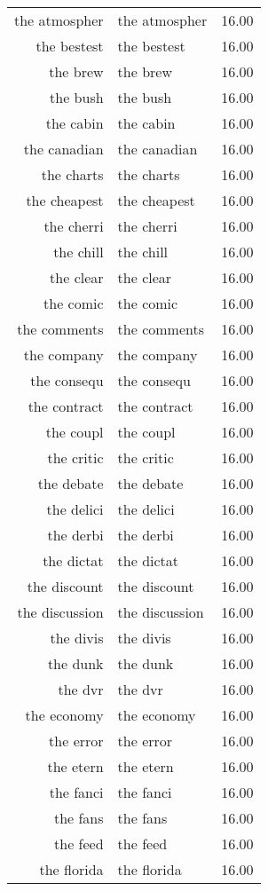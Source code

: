 \begin{table}[ht]
\begin{tabular}{rlr}
  the atmospher & the atmospher & 16.00 \\ 
  the bestest & the bestest & 16.00 \\ 
  the brew & the brew & 16.00 \\ 
  the bush & the bush & 16.00 \\ 
  the cabin & the cabin & 16.00 \\ 
  the canadian & the canadian & 16.00 \\ 
  the charts & the charts & 16.00 \\ 
  the cheapest & the cheapest & 16.00 \\ 
  the cherri & the cherri & 16.00 \\ 
  the chill & the chill & 16.00 \\ 
  the clear & the clear & 16.00 \\ 
  the comic & the comic & 16.00 \\ 
  the comments & the comments & 16.00 \\ 
  the company & the company & 16.00 \\ 
  the consequ & the consequ & 16.00 \\ 
  the contract & the contract & 16.00 \\ 
  the coupl & the coupl & 16.00 \\ 
  the critic & the critic & 16.00 \\ 
  the debate & the debate & 16.00 \\ 
  the delici & the delici & 16.00 \\ 
  the derbi & the derbi & 16.00 \\ 
  the dictat & the dictat & 16.00 \\ 
  the discount & the discount & 16.00 \\ 
  the discussion & the discussion & 16.00 \\ 
  the divis & the divis & 16.00 \\ 
  the dunk & the dunk & 16.00 \\ 
  the dvr & the dvr & 16.00 \\ 
  the economy & the economy & 16.00 \\ 
  the error & the error & 16.00 \\ 
  the etern & the etern & 16.00 \\ 
  the fanci & the fanci & 16.00 \\ 
  the fans & the fans & 16.00 \\ 
  the feed & the feed & 16.00 \\ 
  the florida & the florida & 16.00 \\ 

\end{tabular}
\end{table}
